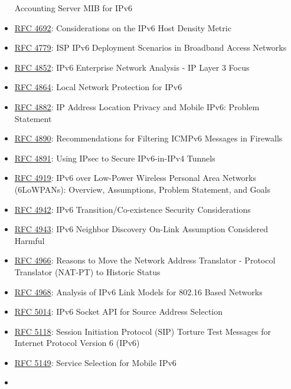 \documentclass[
]{article}
\begin{document}
\begin{itemize}
  Accounting Server MIB for IPv6
\item
  \href{https://www.rfc-editor.org/info/rfc4692}{RFC 4692}:
  Considerations on the IPv6 Host Density Metric
\item
  \href{https://www.rfc-editor.org/info/rfc4779}{RFC 4779}: ISP IPv6
  Deployment Scenarios in Broadband Access Networks
\item
  \href{https://www.rfc-editor.org/info/rfc4852}{RFC 4852}: IPv6
  Enterprise Network Analysis - IP Layer 3 Focus
\item
  \href{https://www.rfc-editor.org/info/rfc4864}{RFC 4864}: Local
  Network Protection for IPv6
\item
  \href{https://www.rfc-editor.org/info/rfc4882}{RFC 4882}: IP Address
  Location Privacy and Mobile IPv6: Problem Statement
\item
  \href{https://www.rfc-editor.org/info/rfc4890}{RFC 4890}:
  Recommendations for Filtering ICMPv6 Messages in Firewalls
\item
  \href{https://www.rfc-editor.org/info/rfc4891}{RFC 4891}: Using IPsec
  to Secure IPv6-in-IPv4 Tunnels
\item
  \href{https://www.rfc-editor.org/info/rfc4919}{RFC 4919}: IPv6 over
  Low-Power Wireless Personal Area Networks (6LoWPANs): Overview,
  Assumptions, Problem Statement, and Goals
\item
  \href{https://www.rfc-editor.org/info/rfc4942}{RFC 4942}: IPv6
  Transition/Co-existence Security Considerations
\item
  \href{https://www.rfc-editor.org/info/rfc4943}{RFC 4943}: IPv6
  Neighbor Discovery On-Link Assumption Considered Harmful
\item
  \href{https://www.rfc-editor.org/info/rfc4966}{RFC 4966}: Reasons to
  Move the Network Address Translator - Protocol Translator (NAT-PT) to
  Historic Status
\item
  \href{https://www.rfc-editor.org/info/rfc4968}{RFC 4968}: Analysis of
  IPv6 Link Models for 802.16 Based Networks
\item
  \href{https://www.rfc-editor.org/info/rfc5014}{RFC 5014}: IPv6 Socket
  API for Source Address Selection
\item
  \href{https://www.rfc-editor.org/info/rfc5118}{RFC 5118}: Session
  Initiation Protocol (SIP) Torture Test Messages for Internet Protocol
  Version 6 (IPv6)
\item
  \href{https://www.rfc-editor.org/info/rfc5149}{RFC 5149}: Service
  Selection for Mobile IPv6
\item

\end{itemize}
\end{document}
